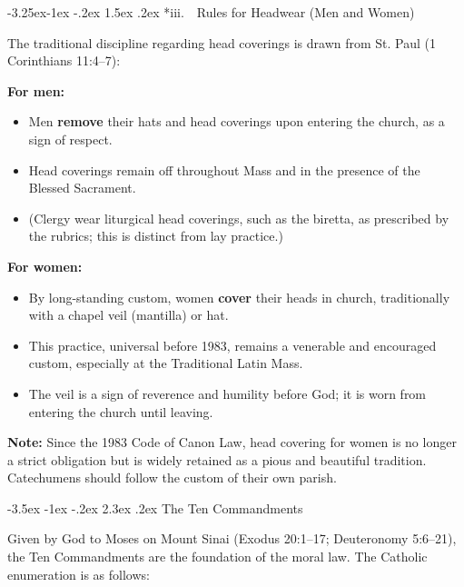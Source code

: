 \documentclass[11pt]{article}
\makeatletter
\renewcommand\section{\@startsection{section}{1}{\z@}%
  {-3.5ex \@plus -1ex \@minus -.2ex}%
  {2.3ex \@plus.2ex}%
  {\normalfont\Large\bfseries\color{churchblue}}}
\renewcommand\subsection{\@startsection{subsection}{2}{\z@}%
  {-3.25ex\@plus -1ex \@minus -.2ex}%
  {1.5ex \@plus .2ex}%
  {\normalfont\large\bfseries\color{churchgold}}}
\makeatother
\begin{document}
\subsection*{iii.~~Rules for Headwear (Men and Women)}

The traditional discipline regarding head coverings is drawn from
St. Paul (1 Corinthians 11:4--7):

\textbf{For men:}
\begin{itemize}
  \item Men \textbf{remove} their hats and head coverings upon entering the church, as a sign of respect.
  \item Head coverings remain off throughout Mass and in the presence of the Blessed Sacrament.
  \item (Clergy wear liturgical head coverings, such as the biretta, as prescribed by the rubrics; this is distinct from lay practice.)
\end{itemize}

\textbf{For women:}
\begin{itemize}
  \item By long-standing custom, women \textbf{cover} their heads in church, traditionally with a chapel veil (mantilla) or hat.
  \item This practice, universal before 1983, remains a venerable and encouraged custom, especially at the Traditional Latin Mass.
  \item The veil is a sign of reverence and humility before God; it is worn from entering the church until leaving.
\end{itemize}

\textbf{Note:} Since the 1983 Code of Canon Law, head covering for women is
no longer a strict obligation but is widely retained as a pious and
beautiful tradition. Catechumens should follow the custom of their own
parish.

\newpage
\section{The Ten Commandments}

Given by God to Moses on Mount Sinai (Exodus 20:1--17; Deuteronomy
5:6--21), the Ten Commandments are the foundation of the moral law. The
Catholic enumeration is as follows:
\end{document}
